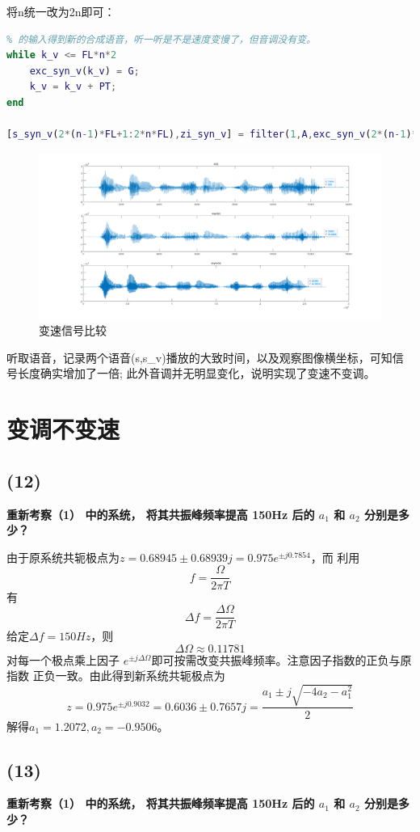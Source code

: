 \documentclass[10pt]{article}
\begin{document}
将n统一改为2n即可：
\begin{lstlisting}[language=matlab]
% (11) 不改变基音周期和预测系数，将合成激励的长度增加一倍，再作为filter
% 的输入得到新的合成语音，听一听是不是速度变慢了，但音调没有变。
while k_v <= FL*n*2
    exc_syn_v(k_v) = G;
    k_v = k_v + PT;
end

[s_syn_v(2*(n-1)*FL+1:2*n*FL),zi_syn_v] = filter(1,A,exc_syn_v(2*(n-1)*FL+1:2*n*FL),zi_syn_v);
\end{lstlisting}
\begin{figure}[h]
	\centering
	\begin{minipage}{0.49\linewidth}
		\centering
		\includegraphics[width=1\linewidth]{drawing2-11.png}
		\caption{变速信号比较}
	\end{minipage}
\end{figure}
听取语音，记录两个语音(s,s\_v)播放的大致时间，以及观察图像横坐标，可知信号长度确实增加了一倍;
此外音调并无明显变化，说明实现了变速不变调。
\section{变调不变速}
\subsection*{(12)}
\textbf{\color{gray}重新考察（1） 中的系统， 
将其共振峰频率提高 150Hz 后的 $a_1$ 和 $a_2$ 分别是多少？}

由于原系统共轭极点为$z=0.68945\pm 0.68939j=0.975e^{\pm j0.7854}$，而
利用$$f=\frac{\Omega}{2\pi T}$$有
$$\Delta f=\frac{\Delta\Omega}{2\pi T}$$
给定$\Delta f=150Hz$，则$$\Delta\Omega\approx0.11781$$
对每一个极点乘上因子
$e^{\pm j\Delta\Omega}$即可按需改变共振峰频率。注意因子指数的正负与原指数
正负一致。由此得到新系统共轭极点为$$z=0.975e^{\pm j0.9032}=0.6036\pm 0.7657j
=\frac{a_1\pm j\sqrt{-4a_2-a_1^2}}{2}$$
解得$a_1=1.2072,a_2=-0.9506$。

\subsection*{(13)}
\textbf{\color{gray}重新考察（1） 中的系统， 
将其共振峰频率提高 150Hz 后的 $a_1$ 和 $a_2$ 分别是多少？}
\end{document}
